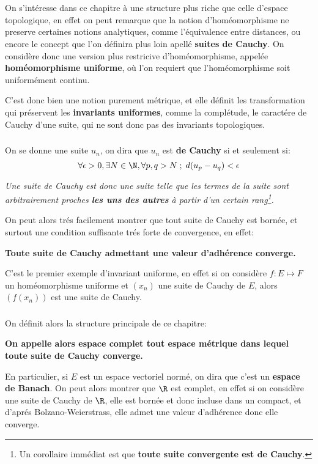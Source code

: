 \chapter*{}
On s'intéresse dans ce chapitre à une structure plus riche que celle d'espace topologique, en effet on peut remarque que la notion d'homéomorphisme ne preserve certaines notions analytiques, comme l'équivalence entre distances, ou encore le concept que l'on définira plus loin apellé \textbf{suites de Cauchy}. On considère donc une version plus restricive d'homéomorphisme, appelée \textbf{homéomorphisme uniforme}, où l'on requiert que l'homéomorphisme soit uniformément continu.\<

C'est donc bien une notion purement métrique, et elle définit les transformation qui préservent les \textbf{invariants uniformes}, comme la complétude, le caractére de Cauchy d'une suite, qui ne sont donc pas des invariants topologiques.

\subsection*{}
On se donne une suite \(u_n\), on dira que \(u_n\) est \textbf{de Cauchy} si et seulement si:
\[
   \forall \epsilon > 0 , \exists N \in \N , \forall p, q > N \; ; \; d(u_p - u_q) < \epsilon
\] 
\begin{center}
   \textit{
       Une suite de Cauchy est donc une suite telle que les termes de la suite sont arbitrairement proches \textbf{les uns des autres} à partir d'un certain rang\footnote[1]{Un corollaire immédiat est que \textbf{toute suite convergente est de Cauchy}.}.
   }
\end{center}
On peut alors trés facilement montrer que tout suite de Cauchy est bornée, et surtout une condition suffisante trés forte de convergence, en effet:
\begin{center}
   \textbf{Toute suite de Cauchy admettant une valeur d'adhérence converge.}
\end{center}
C'est le premier exemple d'invariant uniforme, en effet si on considère \( f : E \longmapsto F \) un homéomorphisme uniforme et \( (x_n) \) une suite de Cauchy de \( E \), alors \( (f(x_n)) \) est une suite de Cauchy.

\subsection*{}
On définit alors la structure principale de ce chapitre:
\begin{center}
   \textbf{On appelle alors espace complet tout espace métrique dans lequel toute suite de Cauchy converge.}
\end{center}
En particulier, si \( E \) est un espace vectoriel normé, on dira que c'est un \textbf{espace de Banach}. On peut alors montrer que \( \R \) est complet, en effet si on considère une suite de Cauchy de \( \R \), elle est bornée et donc incluse dans un compact, et d'aprés Bolzano-Weierstrass, elle admet une valeur d'adhérence donc elle converge.\<

